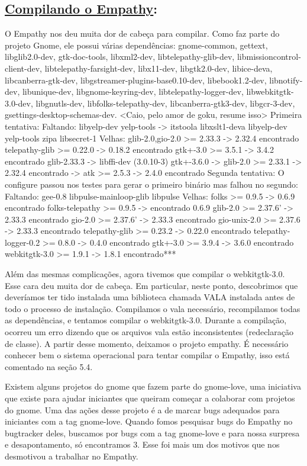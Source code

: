 \subsection*{\underline{Compilando o Empathy}:}

O Empathy nos deu muita dor de cabeça para compilar.
    Como faz parte do projeto Gnome, ele possui várias dependências:
gnome-common, gettext, libglib2.0-dev, gtk-doc-tools, libxml2-dev, libtelepathy-glib-dev, libmissioncontrol-client-dev, libtelepathy-farsight-dev, libx11-dev, libgtk2.0-dev, libice-dev{a}, libcanberra-gtk-dev, libgstreamer-plugins-base0.10-dev, libebook1.2-dev, libnotify-dev, libunique-dev, libgnome-keyring-dev, libtelepathy-logger-dev, libwebkitgtk-3.0-dev, libgnutls-dev, libfolks-telepathy-dev, libcanberra-gtk3-dev, libgcr-3-dev, gsettings-desktop-schemas-dev.
<Caio, pelo amor de goku, resume isso> Primeira tentativa:
Faltando:
  libyelp-dev yelp-tools -> itstool{a} libxslt1-dev{a} libyelp-dev yelp-tools zip{a}
  libsecret-1
    Velhas:
  {glib-2.0,gio-2.0} >= 2.33.3  -> 2.32.4 encontrado
  telepathy-glib >= 0.22.0 -> 0.18.2 encontrado
       gtk+-3.0 >= 3.5.1 -> 3.4.2 encontrado
glib-2.33.3 -> libffi-dev (3.0.10-3)
gtk+-3.6.0 -> glib-2.0 >= 2.33.1 -> 2.32.4 encontrado
       -> atk >= 2.5.3 -> 2.4.0 encontrado
Segunda tentativa:
O configure passou nos testes para   gerar o primeiro binário mas falhou no segundo:
    Faltando:
gee-0.8
libpulse-mainloop-glib
libpulse
Velhas:
folks >= 0.9.5 -> 0.6.9 encontrado
folks-telepathy >= 0.9.5 -> encontrado 0.6.9
glib-2.0 >= 2.37.6' -> 2.33.3 encontrado
gio-2.0 >= 2.37.6' -> 2.33.3 encontrado
gio-unix-2.0 >= 2.37.6 -> 2.33.3 encontrado
telepathy-glib >= 0.23.2 -> 0.22.0 encontrado
telepathy-logger-0.2 >= 0.8.0 -> 0.4.0 encontrado
gtk+-3.0 >= 3.9.4 -> 3.6.0 encontrado
webkitgtk-3.0 >= 1.9.1 -> 1.8.1 encontrado***

Além das mesmas complicações, agora tivemos que compilar o webkitgtk-3.0.
Esse cara deu muita dor de cabeça. Em particular, neste ponto, descobrimos que deveríamos ter tido instalada uma biblioteca chamada VALA instalada antes de todo o processo de instalação.
Compilamos o vala necessário, recompilamos todas as dependências, e tentamos compilar o webkitgtk-3.0. Durante a compilação, ocorreu um erro dizendo que os arquivos vala estão inconsistentes (redeclaração de classe). A partir desse momento, deixamos o projeto empathy. 
É necessário conhecer bem o sistema operacional para tentar compilar o Empathy, isso está comentado na seção 5.4.

Existem alguns projetos do gnome que fazem parte do gnome-love, uma iniciativa que existe para ajudar iniciantes que queiram começar a colaborar com projetos do gnome. Uma das ações desse projeto é a de marcar bugs adequados para iniciantes com a tag gnome-love.
Quando fomos pesquisar bugs do Empathy no bugtracker deles, buscamos por bugs com a tag gnome-love e para nossa surpresa e desapontamento, só encontramos 3. Esse foi mais um dos motivos que nos desmotivou a trabalhar no Empathy.
